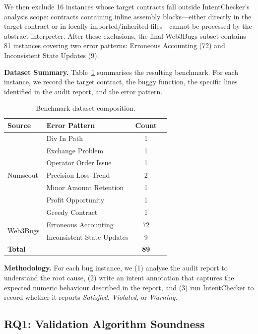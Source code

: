 \documentclass[pdflatex,sn-basic]{sn-jnl}%
\theoremstyle{thmstyleone}%
\theoremstyle{thmstyletwo}%
\theoremstyle{thmstylethree}%
\begin{document}
We then exclude 16 instances whose target contracts fall outside IntentChecker's analysis scope:
contracts containing inline assembly blocks---either directly in the target contract or in locally imported/inherited files---cannot be processed by the abstract interpreter.
After these exclusions, the final Web3Bugs subset contains 81 instances covering two error patterns: Erroneous Accounting (72) and Inconsistent State Updates (9).

\smallskip\noindent\textbf{Dataset Summary.}
Table~\ref{tab:dataset} summarises the resulting benchmark.
For each instance, we record the target contract, the buggy function, the specific lines identified in the audit report, and the error pattern.

\begin{table}[t]
\centering
\caption{Benchmark dataset composition.}
\label{tab:dataset}
\begin{tabular}{llcc}
\hline
\textbf{Source} & \textbf{Error Pattern} & \textbf{Count} \\
\hline
\multirow{7}{*}{Numscout}
  & Div In Path              & 1  \\
  & Exchange Problem         & 1  \\
  & Operator Order Issue     & 1  \\
  & Precision Loss Trend     & 2  \\
  & Minor Amount Retention   & 1  \\
  & Profit Opportunity       & 1  \\
  & Greedy Contract          & 1  \\
\hline
\multirow{2}{*}{Web3Bugs}
  & Erroneous Accounting        & 72 \\
  & Inconsistent State Updates  & 9  \\
\hline
\textbf{Total} & & \textbf{89} \\
\hline
\end{tabular}
\end{table}

\smallskip\noindent\textbf{Methodology.}
For each bug instance, we (1) analyse the audit report to understand the root cause,
(2) write an intent annotation that captures the expected numeric behaviour described in the report,
and (3) run IntentChecker to record whether it reports \textit{Satisfied}, \textit{Violated}, or \textit{Warning}.

\subsection{RQ1: Validation Algorithm Soundness}
\end{document}

